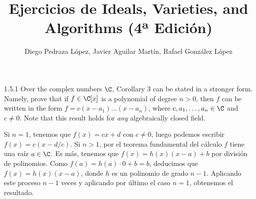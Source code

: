 \documentclass[twoside]{article}
\begin{document}
\title{Ejercicios de Ideals, Varieties, and Algorithms (4ª Edición)}
\author{Diego Pedraza López, Javier Aguilar Martín, Rafael González López}
\maketitle

\begin{ejercicio}{1.5.1}
Over the complex numbers $\C$, Corollary 3 can be stated in a stronger form. Namely, prove that if $f \in \C[x]$ is a polynomial of degree $n > 0$, then $f$ can be written in the form $f = c(x-a_1)\dots(x-a_n)$, where $c,a_1,\dots,a_n \in \C$ and $c \neq 0$.
Note that this result  holds for \emph{any} algebraically closed field.
\end{ejercicio}
\begin{solucion}
Si $n = 1$, tenemos que $f(x) = cx+d$ con $c \neq 0$, luego podemos escribir $f(x) = c(x-d/c)$.
Si $n > 1$, por el teorema fundamental del cálculo $f$ tiene una raíz $a \in \C$.
Es más, tenemos que $f(x) = h(x)(x-a)+b$ por división de polinomios.
Como $f(a) = h(a)\cdot 0 + b = b$, deducimos que $f(x) = h(x)(x-a)$, donde $h$ es un polinomio de grado $n-1$.
Aplicando este proceso $n-1$ veces y aplicando por último el caso $n=1$, obtenemos el resultado.
\end{solucion}

\newpage
\end{document}
